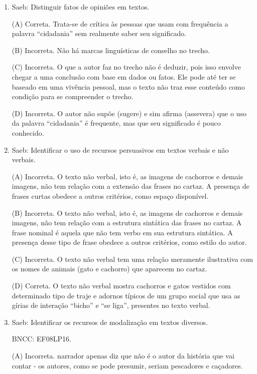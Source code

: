 \begin{enumerate}

\item

Saeb: Distinguir fatos de opiniões em textos.

(A) Correta. Trata-se de crítica às pessoas que usam com frequência a palavra ``cidadania'' sem realmente saber seu significado.

(B) Incorreta. Não há marcas linguísticas de conselho no trecho.

(C) Incorreta. O que a autor faz no trecho não é deduzir, pois isso
envolve chegar a uma conclusão com base em dados ou fatos. Ele pode até
ter se baseado em uma vivência pessoal, mas o texto não traz esse
conteúdo como condição para se compreender o trecho.

(D) Incorreta. O autor não supõe (sugere) e sim afirma (assevera) que o
uso da palavra ``cidadania'' é frequente, mas que seu significado é pouco
conhecido.

\item

Saeb: Identificar o uso de recursos persuasivos em textos verbais e não
verbais.

(A) Incorreta. O texto não verbal, isto é, as imagens de cachorros e
demais imagens, não tem relação com a extensão das frases no cartaz. A
presença de frases curtas obedece a outros critérios, como espaço
disponível.

(B) Incorreta. O texto não verbal, isto é, as imagens de cachorros e
demais imagens, não tem relação com a estrutura sintática das frases no
cartaz. A frase nominal é aquela que não tem verbo em sua estrutura
sintática. A presença desse tipo de frase obedece a outros critérios,
como estilo do autor.

(C) Incorreta. O texto não verbal tem uma relação meramente ilustrativa
com os nomes de animais (gato e cachorro) que aparecem no cartaz.

(D) Correta. O texto não verbal mostra cachorros e gatos vestidos com
determinado tipo de traje e adornos típicos de um grupo social que usa
as gírias de interação ``bicho'' e ``se liga'', presentes no texto
verbal.

\item

Saeb: Identificar os recursos de modalização em textos diversos.

BNCC: EF08LP16.

(A) Incorreta. narrador apenas diz que não é o autor da história que
vai contar - os autores, como se pode presumir, seriam pescadores e caçadores.


\end{enumerate}
